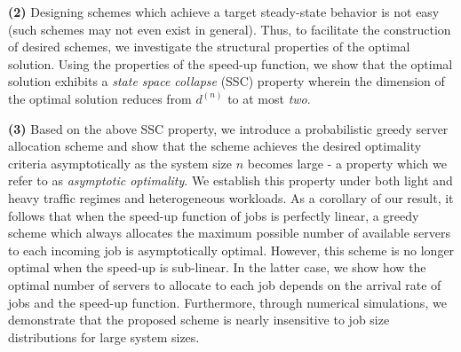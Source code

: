 \documentclass[a4paper]{article}
\theoremstyle{plain}
\theoremstyle{definition}
\theoremstyle{case}
\theoremstyle{remark}
\begin{document}
{\bf (2)} Designing schemes which achieve a target steady-state behavior is not easy (such schemes may not even exist in general). Thus, to facilitate the construction of desired schemes, we investigate the structural properties of the optimal solution. 
Using the properties of the speed-up function, we show that the optimal solution exhibits a {\em state space collapse} (SSC) property wherein the dimension of the optimal solution reduces from $d^{(n)}$ to at most {\em two}. 


{\bf (3)} Based on the above SSC property, we introduce a probabilistic greedy server 
allocation scheme 
and show that the scheme achieves the desired optimality criteria asymptotically as the system size $n$ becomes large - a property which we refer to as {\em asymptotic optimality}. We establish this property under both light and heavy traffic regimes and heterogeneous workloads. 
As a corollary of our result, it follows that when the speed-up function of jobs is perfectly linear, a greedy scheme which always allocates the maximum possible number of available servers to each incoming job is asymptotically optimal. However, this scheme is no longer optimal when the speed-up is sub-linear. In the latter case,  we show how the optimal number of servers to allocate to each job depends on the arrival rate of jobs and the speed-up function. 
Furthermore, through numerical simulations, we demonstrate that the proposed scheme is nearly insensitive to job size distributions for large system sizes. 
\end{document}
